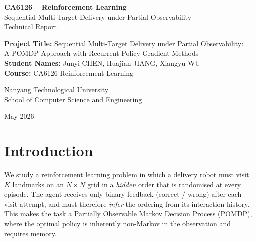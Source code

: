 \documentclass[11pt,a4paper]{article}
\title{}   %
\author{}
\date{}
\begin{document}
\begin{titlepage}
\centering
\vspace*{1.5cm}

{\LARGE \textbf{CA6126 -- Reinforcement Learning}}\\[1.5cm]

{\Large Sequential Multi-Target Delivery under Partial Observability}\\[0.8cm]

{\large Technical Report}\\[2cm]

\begin{flushleft}
\textbf{Project Title:} Sequential Multi-Target Delivery under Partial Observability: \\
\hspace*{5.5em} A POMDP Approach with Recurrent Policy Gradient Methods\\[0.5cm]
\textbf{Student Names:} Junyi CHEN, Huajian JIANG, Xiangyu WU\footnotemark\\[0.5cm]
\textbf{Course:} CA6126 Reinforcement Learning\\[2cm]
\end{flushleft}

\centering
Nanyang Technological University\\
School of Computer Science and Engineering\\[2cm]

\vfill

{\large May 2026}

\end{titlepage}

\tableofcontents
\newpage

\section{Introduction}

We study a reinforcement learning problem in which a delivery robot must visit
$K$ landmarks on an $N \times N$ grid in a \emph{hidden} order that is
randomised at every episode. The agent receives only binary feedback (correct /
wrong) after each visit attempt, and must therefore \emph{infer} the ordering
from its interaction history. This makes the task a Partially Observable Markov
Decision Process (POMDP), where the optimal policy is inherently non-Markov in
the observation and requires memory.
\end{document}
